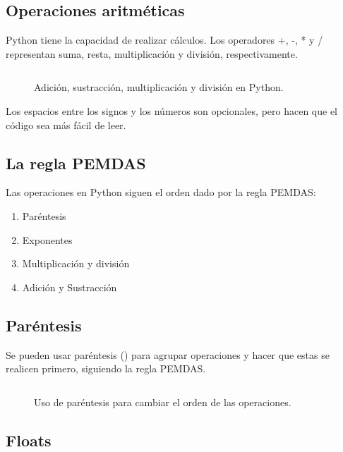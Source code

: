 \documentclass{article}
\begin{document}
\subsection{Operaciones aritméticas}

Python tiene la capacidad de realizar cálculos. Los operadores +, -, * y / representan suma, resta, multiplicación y división, respectivamente.

\begin{figure}[ht!]
  \inputminted[frame=single, linenos]{python}{codigo/2-basico/aritmetica_1.py}
  \caption{Adición, sustracción, multiplicación y división en Python.}
\end{figure}

Los espacios entre los signos y los números son opcionales, pero hacen que el código sea más fácil de leer.

\subsection{La regla PEMDAS}

Las operaciones en Python siguen el orden dado por la regla PEMDAS:

\begin{enumerate}
  \item Paréntesis
  \item Exponentes
  \item Multiplicación y división
  \item Adición y Sustracción
\end{enumerate}


\subsection{Paréntesis}

Se pueden usar paréntesis () para agrupar operaciones y hacer que estas se realicen primero, siguiendo la regla PEMDAS.

\begin{figure}[ht!]
  \inputminted[frame=single, linenos]{python}{codigo/2-basico/aritmetica_3.py}
  \caption{Uso de paréntesis para cambiar el orden de las operaciones.}
\end{figure}

\subsection{Floats}
    
\end{document}
